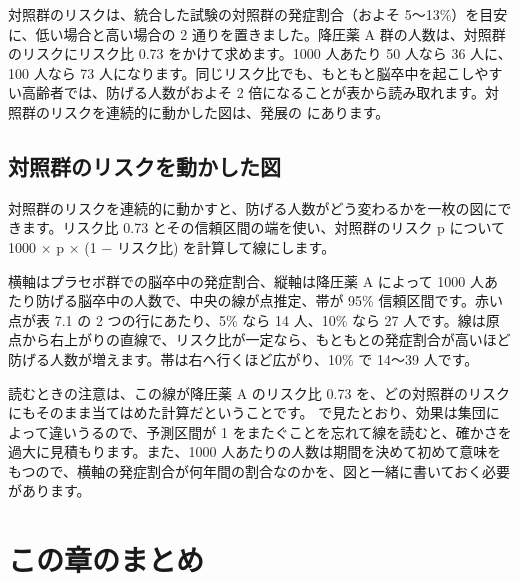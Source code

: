 対照群のリスクは、統合した試験の対照群の発症割合（およそ 5〜13\%）を目安に、低い場合と高い場合の 2 通りを置きました。降圧薬 A 群の人数は、対照群のリスクにリスク比 0.73 をかけて求めます。1000 人あたり 50 人なら 36 人に、100 人なら 73 人になります。同じリスク比でも、もともと脳卒中を起こしやすい高齢者では、防げる人数がおよそ 2 倍になることが表から読み取れます。対照群のリスクを連続的に動かした図は、発展の  にあります。

\subsection{\hatten 対照群のリスクを動かした図}
\label{sec:07-9-1}

対照群のリスクを連続的に動かすと、防げる人数がどう変わるかを一枚の図にできます。リスク比 0.73 とその信頼区間の端を使い、対照群のリスク p について 1000 × p × (1 − リスク比) を計算して線にします。



横軸はプラセボ群での脳卒中の発症割合、縦軸は降圧薬 A によって 1000 人あたり防げる脳卒中の人数で、中央の線が点推定、帯が 95\% 信頼区間です。赤い点が表 7.1 の 2 つの行にあたり、5\% なら 14 人、10\% なら 27 人です。線は原点から右上がりの直線で、リスク比が一定なら、もともとの発症割合が高いほど防げる人数が増えます。帯は右へ行くほど広がり、10\% で 14〜39 人です。

読むときの注意は、この線が降圧薬 A のリスク比 0.73 を、どの対照群のリスクにもそのまま当てはめた計算だということです。 で見たとおり、効果は集団によって違いうるので、予測区間が 1 をまたぐことを忘れて線を読むと、確かさを過大に見積もります。また、1000 人あたりの人数は期間を決めて初めて意味をもつので、横軸の発症割合が何年間の割合なのかを、図と一緒に書いておく必要があります。

\section{この章のまとめ}
\label{sec:07-10}

